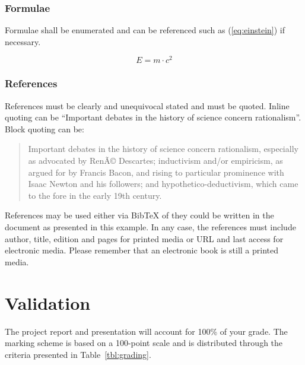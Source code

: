 	
	\subsubsection{Formulae}
	Formulae shall be enumerated and can be referenced such as (\ref{eq:einstein}) if necessary.
	
	\begin{equation}
		E=m\cdot c^2 \label{eq:einstein}
	\end{equation}
	
	\subsubsection{References}
	References must be clearly and unequivocal stated and must be quoted. Inline quoting can be ``Important debates in the history of science concern rationalism''\cite{scientificMethod}. Block quoting can be:
	\begin{quotation}
		Important debates in the history of science concern rationalism, especially as advocated by RenÃ© Descartes; inductivism and/or empiricism, as argued for by Francis Bacon, and rising to particular prominence with Isaac Newton and his followers; and hypothetico-deductivism, which came to the fore in the early 19th century.\cite{scientificMethod}
	\end{quotation}
	
	References may be used either via BibTeX of they could be written in the document as presented in this example. In any case, the references must include author, title, edition and pages for printed media or URL and last access for electronic media. Please remember that an electronic book is still a printed media.
	
	\section{Validation}
	
	The project report and presentation will account for 100\% of your grade. The marking scheme is based on a 100-point scale and is distributed through the criteria presented in Table~\ref{tbl:grading}.
	
